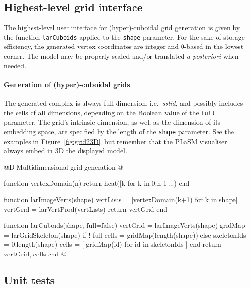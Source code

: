 \subsection{Highest-level grid interface}

The highest-level user interface for (hyper)-cuboidal grid generation is given by the function \texttt{larCuboids}  applied to the \texttt{shape} parameter.  
For the sake of storage efficiency, the generated vertex coordinates are integer and 0-based in the lowest corner. The model may be properly scaled and/or translated \emph{a posteriori} when needed.

\paragraph{Generation of (hyper)-cuboidal grids}

The generated complex is always full-dimension, i.e.~\emph{solid}, and possibly includes the cells of all dimensions, depending on the Boolean value of the \texttt{full} parameter.
The grid's intrinsic dimension, as well as the dimension of its embedding space, are specified by the length of the \texttt{shape} parameter. See the examples in Figure~\ref{fig:grid23D}, but remember that the PLaSM visualiser always embed in 3D the displayed model. 

@D Multidimensional grid generation
@{function vertexDomain(n)
	return hcat([k for k in 0:n-1]...)
end

function larImageVerts(shape)
	vertLists = [vertexDomain(k+1) for k in shape]
	vertGrid = larVertProd(vertLists)
	return vertGrid
end

function larCuboids(shape, full=false)
	vertGrid = larImageVerts(shape)
	gridMap = larGridSkeleton(shape)
	if ! full
		cells = gridMap(length(shape))
	else
		skeletonIds = 0:length(shape)
		cells = [ gridMap(id) for id in skeletonIds ]
	end
	return vertGrid, cells
end
@}



\subsection{Unit tests}

